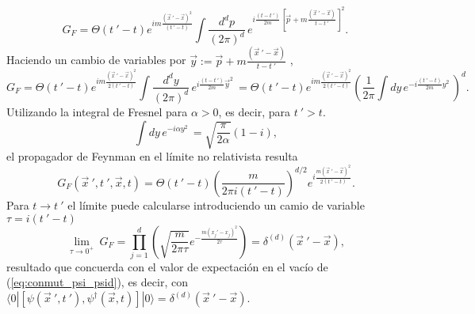 \begin{equation}
G_F=\Theta (t\:'-t)e^{im\frac{(\vec{x}\:'-\vec{x})^2}{(t\:'-t)}}\int \frac{d^dp}{(2\pi)^d}\,e^{i\frac{(t-t\:')}{2m}[\vec{p}+m\frac{(\vec{x}\:'-\vec{x})}{t-t\:'}]^2}.\,
\end{equation}
Haciendo un cambio de variables por $\vec{y}:=\vec{p}+m\frac{(\vec{x}\:'-\vec{x})}{t-t\:'}$ ,
\begin{equation}
G_F=\Theta (t\:'-t)e^{im\frac{(\vec{x}\:'-\vec{x})^2}{2(t\:'-t)}}\int \frac{d^dy}{(2\pi)^d}\,e^{i\frac{(t-t\:')}{2m}\vec{y}^2}\,=\Theta (t\:'-t)e^{im\frac{(\vec{x}\:'-\vec{x})^2}{2(t\:'-t)}}\left(\frac{1}{2\pi}\int dy\, e^{-i\frac{(t\:'-t)}{2m}y^2} \, \right)^d.
\end{equation}
Utilizando la integral de Fresnel para $\alpha>0$, es decir, para $t\:'>t$.
\begin{equation}
\int dy\, e^{-i\alpha y^2} \,=\sqrt{\frac{\pi}{2\alpha}}(1-i),
\end{equation}
el propagador de Feynman en el límite no relativista resulta
\begin{equation}
G_F(\vec{x}\:',t\:',\vec{x},t)=\Theta (t\:'-t)\left(\frac{m}{2\pi i (t\:'-t)}\right)^{d/2}e^{i\frac{m(\vec{x}\:'-\vec{x})^2}{2(t\:'-t)}}.
\end{equation}
Para $t\rightarrow t\:'$ el límite puede calcularse introduciendo un camio de variable $\tau=i(t\:'-t)$
\begin{equation}
\lim_{\tau \rightarrow 0^{+}}\:G_F=\prod_{j=1}^{d}\left(\sqrt{\frac{m}{2\pi \tau}}e^{-\frac{m(x_j'-x_j)^2}{2\tau}}\right)=\delta^{(d)}(\vec{x}\:'-\vec{x}),
\end{equation}
resultado que concuerda con el valor de expectación en el vacío de (\ref{eq:conmut_psi_psid}), es decir, con $\langle 0|[\psi(\vec{x}\:',t\:'),\psi^{\dag}(\vec{x},t)]|0 \rangle=\delta^{(d)}(\vec{x}\:'-\vec{x})$.\\

